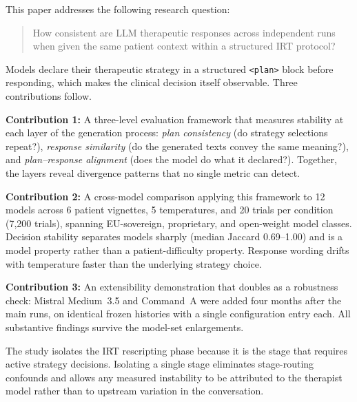 This paper addresses the following research question:

\begin{quote}
How consistent are LLM therapeutic responses across independent runs when given the same patient context within a structured IRT protocol?
\end{quote}

\noindent Models declare their therapeutic strategy in a structured \texttt{<plan>} block before responding, which makes the clinical decision itself observable. Three contributions follow.

\textbf{Contribution 1:} A three-level evaluation framework that measures stability at each layer of the generation process: \emph{plan consistency} (do strategy selections repeat?), \emph{response similarity} (do the generated texts convey the same meaning?), and \emph{plan--response alignment} (does the model do what it declared?). Together, the layers reveal divergence patterns that no single metric can detect.

\textbf{Contribution 2:} A cross-model comparison applying this framework to 12 models across 6 patient vignettes, 5 temperatures, and 20 trials per condition (7{,}200 trials), spanning EU-sovereign, proprietary, and open-weight model classes. Decision stability separates models sharply (median Jaccard 0.69--1.00) and is a model property rather than a patient-difficulty property. Response wording drifts with temperature faster than the underlying strategy choice.

\textbf{Contribution 3:} An extensibility demonstration that doubles as a robustness check: Mistral Medium~3.5 and Command~A were added four months after the main runs, on identical frozen histories with a single configuration entry each. All substantive findings survive the model-set enlargements.

The study isolates the IRT rescripting phase because it is the stage that requires active strategy decisions. Isolating a single stage eliminates stage-routing confounds and allows any measured instability to be attributed to the therapist model rather than to upstream variation in the conversation.
